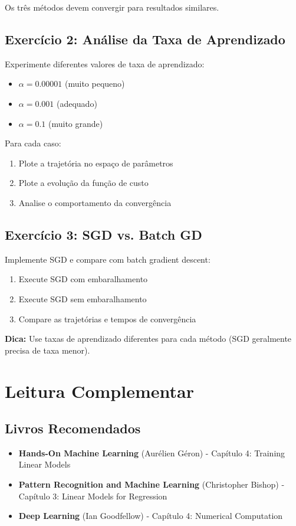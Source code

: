 \documentclass[a4paper,12pt]{article}
\begin{document}
Os três métodos devem convergir para resultados similares.

\subsection{Exercício 2: Análise da Taxa de Aprendizado}
Experimente diferentes valores de taxa de aprendizado:
\begin{itemize}
    \item $\alpha = 0.00001$ (muito pequeno)
    \item $\alpha = 0.001$ (adequado)
    \item $\alpha = 0.1$ (muito grande)
\end{itemize}

Para cada caso:
\begin{enumerate}
    \item Plote a trajetória no espaço de parâmetros
    \item Plote a evolução da função de custo
    \item Analise o comportamento da convergência
\end{enumerate}

\subsection{Exercício 3: SGD vs. Batch GD}
Implemente SGD e compare com batch gradient descent:
\begin{enumerate}
    \item Execute SGD com embaralhamento
    \item Execute SGD sem embaralhamento
    \item Compare as trajetórias e tempos de convergência
\end{enumerate}

\textbf{Dica:} Use taxas de aprendizado diferentes para cada método (SGD geralmente precisa de taxa menor).


\section{Leitura Complementar}

\subsection{Livros Recomendados}
\begin{itemize}
    \item \textbf{Hands-On Machine Learning} (Aurélien Géron) - Capítulo 4: Training Linear Models
    \item \textbf{Pattern Recognition and Machine Learning} (Christopher Bishop) - Capítulo 3: Linear Models for Regression
    \item \textbf{Deep Learning} (Ian Goodfellow) - Capítulo 4: Numerical Computation
\end{itemize}
\end{document}
